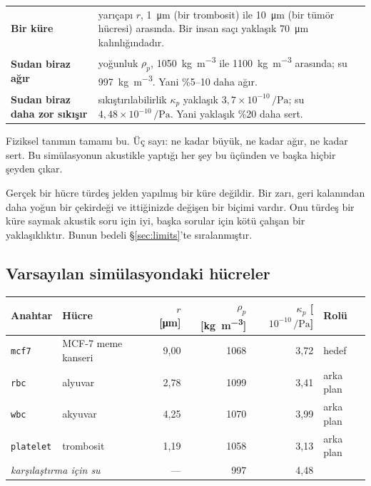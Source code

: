 \documentclass[11pt,a4paper]{article}
\newcommand{\dims}[1]{\textcolor{muted}{\footnotesize [#1]}}
\begin{document}
\begin{center}
\small
\begin{tabular}{lp{10.2cm}}
\toprule
\textbf{Bir küre} & yarıçapı $r$, \SI{1}{\micro\meter} (bir trombosit) ile
\SI{10}{\micro\meter} (bir tümör hücresi) arasında. Bir insan saçı yaklaşık
\SI{70}{\micro\meter} kalınlığındadır. \\[3pt]
\textbf{Sudan biraz ağır} & yoğunluk $\rho_p$,
\SI{1050}{\kilogram\per\cubic\meter} ile
\SI{1100}{\kilogram\per\cubic\meter} arasında; su
\SI{997}{\kilogram\per\cubic\meter}. Yani \%5--10 daha ağır. \\[3pt]
\textbf{Sudan biraz daha zor sıkışır} & sıkıştırılabilirlik $\kappa_p$ yaklaşık
$3{,}7\times10^{-10}\,\si{\per\pascal}$; su
$4{,}48\times10^{-10}\,\si{\per\pascal}$. Yani yaklaşık \%20 daha sert. \\
\bottomrule
\end{tabular}
\end{center}

Fiziksel tanımın tamamı bu. Üç sayı: ne kadar büyük, ne kadar ağır, ne kadar
sert. Bu simülasyonun akustikle yaptığı her şey bu üçünden ve başka hiçbir
şeyden çıkar.

\begin{warnbox}
Gerçek bir hücre türdeş jelden yapılmış bir küre değildir. Bir zarı, geri
kalanından daha yoğun bir çekirdeği ve ittiğinizde değişen bir biçimi vardır.
Onu türdeş bir küre saymak akustik soru için iyi, başka sorular için kötü
çalışan bir yaklaşıklıktır. Bunun bedeli \S\ref{sec:limits}'te sıralanmıştır.
\end{warnbox}

\subsection*{Varsayılan simülasyondaki hücreler}

\begin{center}
\small
\begin{tabular}{llrrrl}
\toprule
\textbf{Anahtar} & \textbf{Hücre} & $r$ \dims{\si{\micro\meter}} &
$\rho_p$ \dims{\si{\kilogram\per\cubic\meter}} &
$\kappa_p$ \dims{$10^{-10}\,\si{\per\pascal}$} & \textbf{Rolü} \\
\midrule
\texttt{mcf7} & MCF-7 meme kanseri & 9,00 & 1068 & 3,72 & hedef \\
\texttt{rbc}  & alyuvar            & 2,78 & 1099 & 3,41 & arka plan \\
\texttt{wbc}  & akyuvar            & 4,25 & 1070 & 3,99 & arka plan \\
\texttt{platelet} & trombosit      & 1,19 & 1058 & 3,13 & arka plan \\
\midrule
\multicolumn{2}{l}{\emph{karşılaştırma için su}} & --- & 997 & 4,48 & \\
\bottomrule
\end{tabular}
\end{center}
\end{document}
